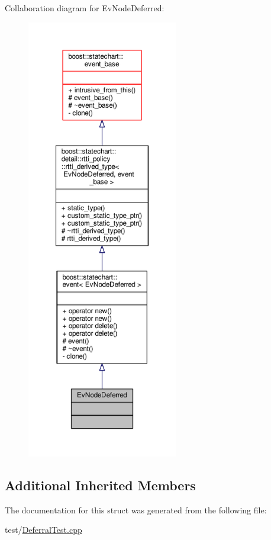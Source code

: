 Collaboration diagram for Ev\+Node\+Deferred\+:
\nopagebreak
\begin{figure}[H]
\begin{center}
\leavevmode
\includegraphics[height=550pt]{struct_ev_node_deferred__coll__graph}
\end{center}
\end{figure}
\subsection*{Additional Inherited Members}


The documentation for this struct was generated from the following file\+:\begin{DoxyCompactItemize}
\item 
test/\mbox{\hyperlink{_deferral_test_8cpp}{Deferral\+Test.\+cpp}}\end{DoxyCompactItemize}
